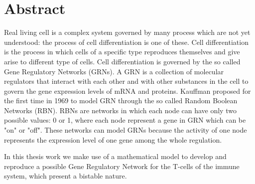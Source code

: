 
\chapter*{Abstract}

Real living cell is a complex system governed by many process which are not yet understood: the process of cell differentiation is one of these. 
Cell  differentiation is the process in which cells of a specific type reproduces themselves and give arise to different type of cells.
Cell differentiation is governed by the so called Gene Regulatory Networks (GRNs).
A GRN is a collection of molecular regulators that interact with each other and with other substances in the cell to govern the gene expression levels of mRNA and proteins. 
Kauffman proposed for the first time in 1969 to model GRN through the so called Random Boolean Networks (RBN).
RBNs are networks in which each node can have only two possible values: 0 or 1, where each node represent a gene in GRN which can be "on" or "off".
These networks can model GRNs because the activity of one node represents the expression level of one gene among the whole regulation.

In this thesis work we make use of a mathematical model to develop and reproduce a possible Gene Regulatory Network for the T-cells of the immune system, which present a bistable nature.



